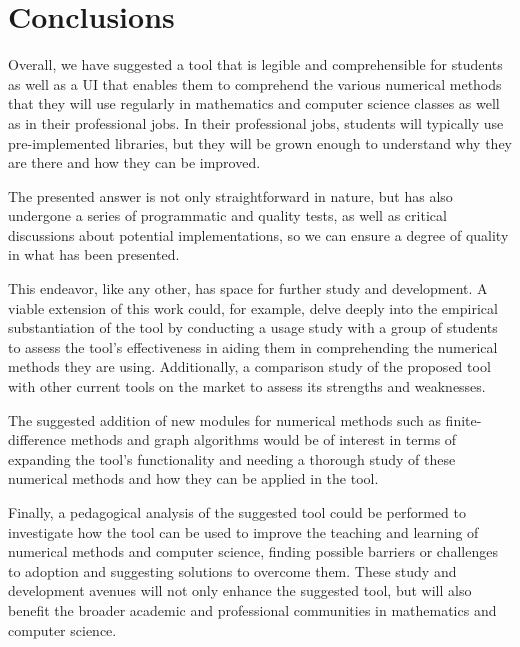 \chapter{Conclusions}
Overall, we have suggested a tool that is legible and comprehensible for students as well as a UI that enables them to comprehend the various numerical methods that they will use regularly in mathematics and computer science classes as well as in their professional jobs. In their professional jobs, students will typically use pre-implemented libraries, but they will be grown enough to understand why they are there and how they can be improved.

The presented answer is not only straightforward in nature, but has also undergone a series of programmatic and quality tests, as well as critical discussions about potential implementations, so we can ensure a degree of quality in what has been presented.

This endeavor, like any other, has space for further study and development. A viable extension of this work could, for example, delve deeply into the empirical substantiation of the tool by conducting a usage study with a group of students to assess the tool's effectiveness in aiding them in comprehending the numerical methods they are using. Additionally, a comparison study of the proposed tool with other current tools on the market to assess its strengths and weaknesses.


The suggested addition of new modules for numerical methods such as finite-difference methods and graph algorithms would be of interest in terms of expanding the tool's functionality and needing a thorough study of these numerical methods and how they can be applied in the tool.

Finally, a pedagogical analysis of the suggested tool could be performed to investigate how the tool can be used to improve the teaching and learning of numerical methods and computer science, finding possible barriers or challenges to adoption and suggesting solutions to overcome them. These study and development avenues will not only enhance the suggested tool, but will also benefit the broader academic and professional communities in mathematics and computer science.